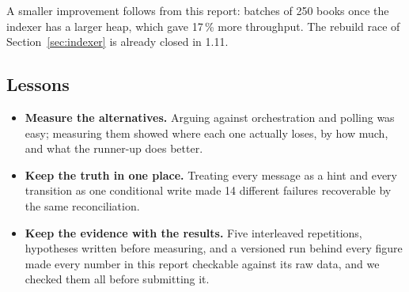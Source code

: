 A smaller improvement follows from this report: batches of 250 books once the indexer has a larger heap, which gave
17\,\% more throughput. The rebuild race of Section~\ref{sec:indexer} is already closed in  1.11.

\subsection{Lessons}

\begin{itemize}
\item \textbf{Measure the alternatives.} Arguing against orchestration and polling was easy; measuring them showed
  where each one actually loses, by how much, and what the runner-up does better.
\item \textbf{Keep the truth in one place.} Treating every message as a hint and every transition as one conditional
  write made 14 different failures recoverable by the same reconciliation.
\item \textbf{Keep the evidence with the results.} Five interleaved repetitions, hypotheses written before measuring,
  and a versioned run behind every figure made every number in this report checkable against its raw data, and we
  checked them all before submitting it.
\end{itemize}
